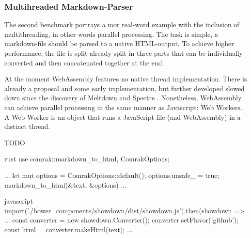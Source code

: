 \subsubsection{Multihreaded Markdown-Parser}
The second benchmark portrays a mor real-word example with the inclusion of multithreading, in other words parallel processing. The task is simple, a \gls{markdown}-file should be parsed to a native HTML-output. To achieve higher performance, the file is split already split in three parts that can be individually converted and then concatenated together at the end.

At the moment WebAssembly features no native thread implementation. There is already a proposal and some early implementation, but further developed slowed down since the discovery of Meltdown and Spectre \cite[cf.][]{wasm:threads}. Nonetheless, WebAssembly can achieve parallel processing in the same manner as Javascript: Web Workers. A Web Worker is an object that runs a JavaScript-file (and WebAssembly) in a distinct thread. 

TODO

\begin{listing}
\noindent
\begin{minipage}[t]{0.45\textwidth}
\begin{code}[]{rust}
use comrak::{markdown_to_html, ComrakOptions};

...
let mut options = ComrakOptions::default();
options.unsafe_ = true;
markdown_to_html(&text, &options)
...
\end{code}
\end{minipage}
\hspace{1cm}
\begin{minipage}[t]{0.45\textwidth}
\begin{code}[]{javascript}
import('./bower_components/showdown/dist/showdown.js').then(showdown => {
    ...
    const converter = new showdown.Converter();
    converter.setFlavor('github');
    const html = converter.makeHtml(text);
    ...
}
\end{code}
\end{minipage}
\caption{Markdown-Parser source code - Rust/Wasm - JS}
\label{lst:wasm-code}
\end{listing}

